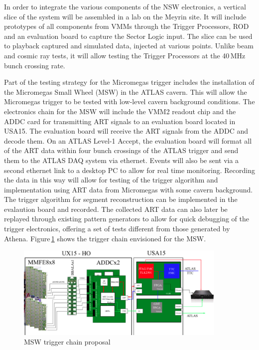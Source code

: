 
In order to integrate the various components of the NSW electronics,
a vertical slice of the system will be assembled in a lab on the Meyrin site.
It will include prototypes of all components from VMMs through the Trigger Processors, ROD and an evaluation board to capture the Sector Logic input.
The slice can be used to playback captured and simulated data, injected at various points.
Unlike beam and cosmic ray tests, it will allow testing the Trigger Processors at the 40\,MHz bunch crossing rate.

Part of the testing strategy for the Micromegas trigger includes
the installation of the Micromegas Small Wheel (MSW) in the ATLAS
cavern.
This will allow the Micromegas trigger to be tested with low-level cavern background conditions.
The electronics chain for the MSW will
include the VMM2 readout chip and the ADDC card for transmitting ART
signals to an evaluation board located in USA15. The evaluation board
will receive the ART signals from the ADDC and decode them. On an
ATLAS Level-1 Accept, the evaluation board will format all of the ART
data within four bunch crossings of the ATLAS trigger and send them to
the ATLAS DAQ system via ethernet. Events will also be sent via a second ethernet
link to a desktop PC to allow for real time monitoring. Recording the
data in this way will allow for testing of the trigger algorithm and
implementation using ART data from Micromegas with some cavern background.
The trigger algorithm for segment reconstruction can be implemented in the evalaution board and recorded.
The collected ART data can also later be replayed through existing pattern
generators to allow for quick debugging of the trigger electronics,
offering a set of tests different from those generated by Athena.
Figure\,\ref{fig:MSWChain} shows the trigger chain envisioned for the MSW.

\begin{figure}[h!]
 \centering
 \includegraphics[width=0.9\textwidth]{figures/MSW_Trigger}
 \caption{MSW trigger chain proposal}
 \label{fig:MSWChain}
 \end{figure}


\FloatBarrier